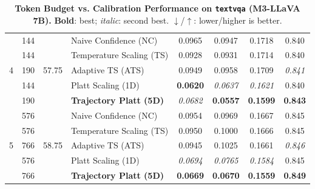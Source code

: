 \begin{table}[t]
\begin{tabular}{ccclcccc}
\multirow{5}{*}{4} & 144 & \multirow{5}{*}{57.75} & Naive Confidence (NC) & 0.0965 & 0.0947 & 0.1718 & 0.840 \\
 & 144 &  & Temperature Scaling (TS) & 0.0928 & 0.0931 & 0.1714 & 0.840 \\
 & 190 &  & Adaptive TS (ATS) & 0.0949 & 0.0958 & 0.1709 & \textit{0.841} \\
 & 144 &  & Platt Scaling (1D) & \textbf{0.0620} & \textit{0.0637} & \textit{0.1621} & 0.840 \\
 & 190 &  & \textbf{Trajectory Platt (5D)} & \textit{0.0682} & \textbf{0.0557} & \textbf{0.1599} & \textbf{0.843} \\
\midrule
\multirow{5}{*}{5} & 576 & \multirow{5}{*}{58.75} & Naive Confidence (NC) & 0.0954 & 0.0969 & 0.1667 & 0.845 \\
 & 576 &  & Temperature Scaling (TS) & 0.0950 & 0.1000 & 0.1666 & 0.845 \\
 & 766 &  & Adaptive TS (ATS) & 0.0945 & 0.1025 & 0.1661 & \textit{0.846} \\
 & 576 &  & Platt Scaling (1D) & \textit{0.0694} & \textit{0.0765} & \textit{0.1584} & 0.845 \\
 & 766 &  & \textbf{Trajectory Platt (5D)} & \textbf{0.0669} & \textbf{0.0670} & \textbf{0.1559} & \textbf{0.849} \\
\bottomrule
\end{tabular}
\caption{\textbf{Token Budget vs. Calibration Performance on \texttt{textvqa} (M3-LLaVA 7B).} \textbf{Bold}: best; \textit{italic}: second best. $\downarrow$/$\uparrow$: lower/higher is better.}
\label{tab:token_budget_textvqa_m3}
\end{table}

